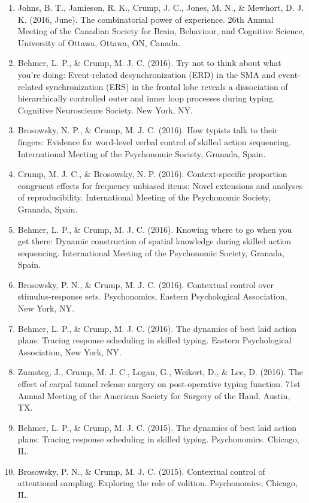 \documentclass[11pt,a4paper,]{moderncv}
\begin{document}
\begin{enumerate}
\item
  Johns, B. T., Jamieson, R. K., Crump, J. C., Jones, M. N., \& Mewhort, D. J. K. (2016, June). The combinatorial power of experience. 26th Annual Meeting of the Canadian Society for Brain, Behaviour, and Cognitive Science, University of Ottawa, Ottawa, ON, Canada.
\item
  Behmer, L. P., \& Crump, M. J. C. (2016). Try not to think about what you're doing: Event-related desynchronization (ERD) in the SMA and event-related synchronization (ERS) in the frontal lobe reveals a dissociation of hierarchically controlled outer and inner loop processes during typing. Cognitive Neuroscience Society. New York, NY.
\item
  Brosowsky, N. P., \& Crump, M. J. C. (2016). How typists talk to their fingers: Evidence for word-level verbal control of skilled action sequencing. International Meeting of the Psychonomic Society, Granada, Spain.
\item
  Crump, M. J. C., \& Brosowsky, N. P. (2016). Context-specific proportion congruent effects for frequency unbiased items: Novel extensions and analyses of reproducibility. International Meeting of the Psychonomic Society, Granada, Spain.
\item
  Behmer, L. P., \& Crump, M. J. C. (2016). Knowing where to go when you get there: Dynamic construction of spatial knowledge during skilled action sequencing. International Meeting of the Psychonomic Society, Granada, Spain.
\item
  Brosowsky, P. N., \& Crump, M. J. C. (2016). Contextual control over stimulus-response sets. Psychonomics, Eastern Psychological Association, New York, NY.
\item
  Behmer, L. P., \& Crump, M. J. C. (2016). The dynamics of best laid action plans: Tracing response scheduling in skilled typing. Eastern Psychological Association, New York, NY.
\item
  Zumsteg, J., Crump, M. J. C., Logan, G., Weikert, D., \& Lee, D. (2016). The effect of carpal tunnel release surgery on post-operative typing function. 71st Annual Meeting of the American Society for Surgery of the Hand. Austin, TX.
\item
  Behmer, L. P., \& Crump, M. J. C. (2015). The dynamics of best laid action plans: Tracing response scheduling in skilled typing. Psychonomics. Chicago, IL.
\item
  Brosowsky, P. N., \& Crump, M. J. C. (2015). Contextual control of attentional sampling: Exploring the role of volition. Psychonomics, Chicago, IL.

\end{enumerate}
\end{document}
